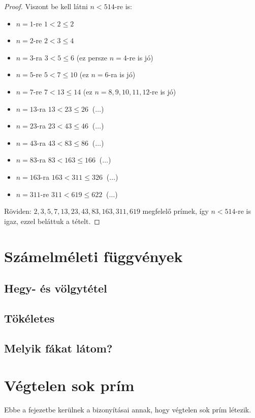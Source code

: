 \documentclass[12pt]{book}
\theoremstyle{plain} %
\theoremstyle{definition} %
\theoremstyle{remark}
\numberwithin{equation}{section}  %
\begin{document}
\begin{proof}
		Viszont be kell látni $n < 514$-re is:
		\begin{itemize}
			\item{$n = 1$-re $1<2\leq 2$}
			\item{$n = 2$-re $2<3\leq 4$}
			\item{$n = 3$-ra $3<5\leq 6$ (ez persze $n=4$-re is jó)}
			\item{$n = 5$-re $5<7\leq 10$ (ez $n=6$-ra is jó)}
			\item{$n = 7$-re $7<13\leq 14$ (ez $n=8,9,10,11,12$-re is jó)}
			\item{$n = 13$-ra $13<23\leq 26\ $ ($\ldots$)}
			\item{$n = 23$-ra $23<43\leq 46\ $ ($\ldots$)}
			\item{$n = 43$-ra $43<83\leq 86\ $ ($\ldots$)}
			\item{$n = 83$-ra $83<163\leq 166\ $ ($\ldots$)}
			\item{$n = 163$-ra $163<311\leq 326\ $ ($\ldots$)}
			\item{$n = 311$-re $311< 619 \leq 622\ $ ($\ldots$)}
		\end{itemize}
		Röviden: $2, 3, 5, 7, 13, 23, 43, 83, 163, 311, 619$ megfelelő prímek, így $n < 514$-re is igaz, ezzel beláttuk a tételt.
	\end{proof}


	\chapter{Számelméleti függvények}
	
	\section{Hegy- és völgytétel}
	\section{Tökéletes}
	\section{Melyik fákat látom?}
	
	
	\chapter*{Végtelen  sok prím}
	\setcounter{chapter}{\thechapter+1}
	\setcounter{section}{0}
	Ebbe a fejezetbe kerülnek a bizonyításai annak, hogy végtelen sok prím létezik.
	
\end{document}
